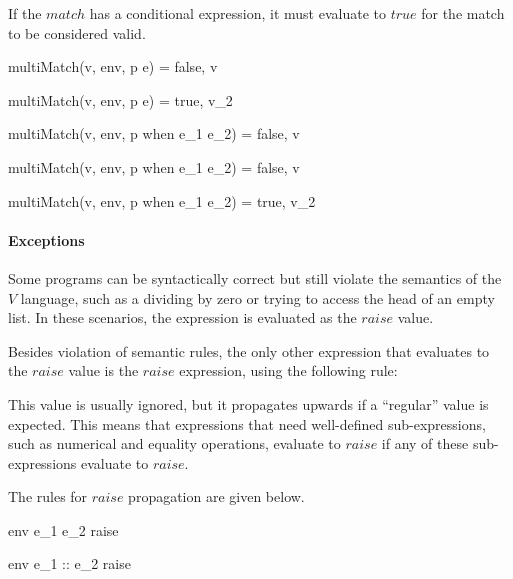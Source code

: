 \documentclass{article}
\begin{document}
If the $match$ has a conditional expression, it must evaluate to $true$ for the match to be considered valid.

  {multiMatch(v, \mbox{env}, p \rightarrow e) = false, v}

  {multiMatch(v, \mbox{env}, p \rightarrow e) = true, v_2}

  {multiMatch(v, \mbox{env}, p \; \mbox{when} \; e_1 \rightarrow e_2) = false, v}

  {multiMatch(v, \mbox{env}, p \; \mbox{when} \; e_1 \rightarrow e_2) = false, v}

  {multiMatch(v, \mbox{env}, p \; \mbox{when} \; e_1 \rightarrow e_2) = true, v_2}

\paragraph{Exceptions}

Some programs can be syntactically correct but still violate the semantics of the $V$ language, such as a dividing by zero or trying to access the head of an empty list.
In these scenarios, the expression is evaluated as the $raise$ value.

Besides violation of semantic rules, the only other expression that evaluates to the $raise$ value is the $raise$ expression, using the following rule:


This value is usually ignored, but it propagates upwards if a ``regular'' value is expected.
This means that expressions that need well-defined sub-expressions, such as numerical and equality operations, evaluate to $raise$ if any of these sub-expressions evaluate to $raise$.

The rules for $raise$ propagation are given below.

    {\mbox{env} \vdash e_1 e_2 \Downarrow raise}

    {\mbox{env} \vdash e_1 :: e_2 \Downarrow raise}
\end{document}
